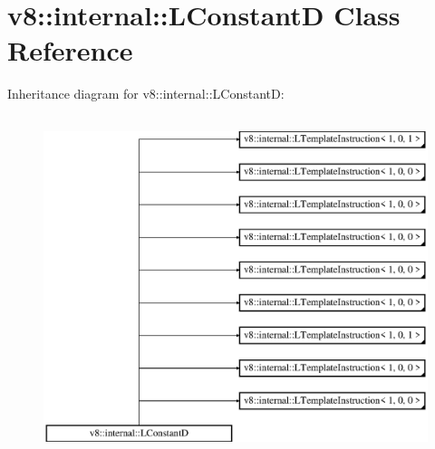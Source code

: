 \hypertarget{classv8_1_1internal_1_1_l_constant_d}{}\section{v8\+:\+:internal\+:\+:L\+ConstantD Class Reference}
\label{classv8_1_1internal_1_1_l_constant_d}
Inheritance diagram for v8\+:\+:internal\+:\+:L\+ConstantD\+:\begin{figure}[H]
\begin{center}
\leavevmode
\includegraphics[height=10.000000cm]{classv8_1_1internal_1_1_l_constant_d}
\end{center}
\end{figure}
